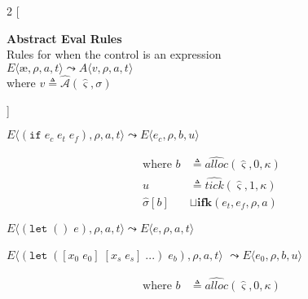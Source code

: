 \documentclass[12pt,draft]{article}
\newcommand\mae{\ensuremath{\text{\ae}}}
\newcommand{\ifsyn}[3]{(\texttt{if}\;#1\;#2\;#3)}
\begin{document}
\newpage

\newpage

\begin{multicols*}{2}
[
\begin{center}
\textbf{Abstract Eval Rules} \\
Rules for when the control is an expression \\
\vspace{10mm}
  $E\langle \mae , \rho , a , t \rangle
  \leadsto
  A\langle v , \rho , a , t \rangle$ \\
where $v \triangleq \hat{\mathcal{A}}(\hat{\varsigma}, \sigma)$ \\
\end{center}
]
\begin{center}
  $E\langle \ifsyn{e_c}{e_t}{e_f} , \rho , a , t \rangle
  \leadsto
  E\langle e_c , \rho , b , u \rangle$
\end{center}
\vspace{-7mm}
\begin{align*}
\text{where } b &\triangleq \widehat{alloc}(\hat{\varsigma}, 0, \kappa) \\
u &\triangleq \widehat{tick}(\hat{\varsigma}, 1, \kappa) \\
\hat{\sigma}[b] &\sqcup \textbf{ifk}(e_t, e_f, \rho, a)
\end{align*}
\begin{center}
  $E\langle (\texttt{let}\;()\;e) , \rho , a , t \rangle
  \leadsto
  E\langle e , \rho , a , t \rangle$
\end{center}
\begin{center}
  $E\langle
  (\texttt{let}\;([x_0\;e_0]\;[x_s\;e_s]\;...)\;e_b) , \rho , a , t
  \rangle$
  $\leadsto E\langle e_0 , \rho , b , u \rangle$
\end{center}
\vspace{-7mm}
\begin{align*}
\text{where } b &\triangleq \widehat{alloc}(\hat{\varsigma}, 0, \kappa) \\

\end{align*}
\end{multicols*}
\end{document}

